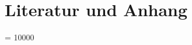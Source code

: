 \documentclass
[a4paper,german,
11pt												%
]
{scrreprt}
\begin{document}
\pagestyle{fancy}									%
%
\renewcommand{\chaptermark}[1]{\markboth{\uppercase{\thechapter\ #1}}{}}
\renewcommand{\sectionmark}[1]{\markright{\thesection\ #1}}
\lhead{\slshape \nouppercase \leftmark }
\chead{}
\rhead{\slshape \nouppercase \rightmark }
\lfoot{}
\cfoot{\thepage}
\rfoot{}
\renewcommand{\headrulewidth}{0.4pt}
\renewcommand{\footrulewidth}{0pt}

%

%
 



%
%
\clearpage
%

%
\clearpage {}
%
%
\titleformat{\chapter}[display]{\normalfont\huge\bfseries}{\chaptertitlename\ \thechapter}{20pt}{\Huge}
%
%
\part{Literatur und Anhang}
\label{part_anhang}
\interlinepenalty = 10000
%
%
 {}

%
\clearpage

%
%
%
\newpage                                    
\pagestyle{empty}
\begin{figure}[H]
\centering
\end{figure}
%
\end{document}
